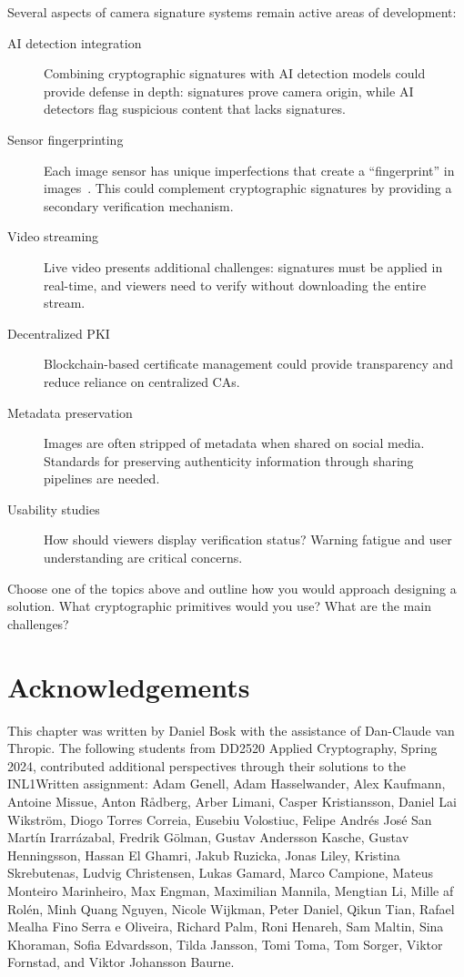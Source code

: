 Several aspects of camera signature systems remain active areas of development:

\begin{description}
  \item[AI detection integration] Combining cryptographic signatures with AI 
    detection models could provide defense in depth: signatures prove camera 
    origin, while AI detectors flag suspicious content that lacks signatures.
  \item[Sensor fingerprinting] Each image sensor has unique imperfections
    that create a \enquote{fingerprint} in
    images~\autocite{LukasFridrichGoljan2006prnu}.
    This could complement cryptographic signatures by providing a secondary 
    verification mechanism.
  \item[Video streaming] Live video presents additional challenges: signatures 
    must be applied in real-time, and viewers need to verify without 
    downloading the entire stream.
  \item[Decentralized \ac{PKI}] Blockchain-based certificate management could
    provide transparency and reduce reliance on centralized CAs.
  \item[Metadata preservation] Images are often stripped of metadata when 
    shared on social media.
    Standards for preserving authenticity information through sharing 
    pipelines are needed.
  \item[Usability studies] How should viewers display verification status?
    Warning fatigue and user understanding are critical concerns.
\end{description}

\begin{exercise}
  Choose one of the topics above and outline how you would approach designing a 
  solution.
  What cryptographic primitives would you use?
  What are the main challenges?
\end{exercise}


\section*{Acknowledgements}

This chapter was written by Daniel Bosk with the assistance of Dan-Claude van 
Thropic.
The following students from DD2520 Applied Cryptography, Spring 2024, 
contributed additional perspectives through their solutions to the INL1Written 
assignment:
Adam Genell,
Adam Hasselwander,
Alex Kaufmann,
Antoine Missue,
Anton Rådberg,
Arber Limani,
Casper Kristiansson,
Daniel Lai Wikström,
Diogo Torres Correia,
Eusebiu Volostiuc,
Felipe Andrés José San Martín Irarrázabal,
Fredrik Gölman,
Gustav Andersson Kasche,
Gustav Henningsson,
Hassan El Ghamri,
Jakub Ruzicka,
Jonas Liley,
Kristina Skrebutenas,
Ludvig Christensen,
Lukas Gamard,
Marco Campione,
Mateus Monteiro Marinheiro,
Max Engman,
Maximilian Mannila,
Mengtian Li,
Mille af Rolén,
Minh Quang Nguyen,
Nicole Wijkman,
Peter Daniel,
Qikun Tian,
Rafael Mealha Fino Serra e Oliveira,
Richard Palm,
Roni Henareh,
Sam Maltin,
Sina Khoraman,
Sofia Edvardsson,
Tilda Jansson,
Tomi Toma,
Tom Sorger,
Viktor Fornstad,
and
Viktor Johansson Baurne.


